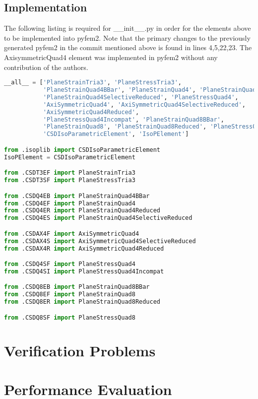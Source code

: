 \documentclass[10pt,letterpaper]{report}
\numberwithin{equation}{chapter}
\begin{document}
\section{Implementation}
The following listing is required for \_\_init\_\_.py in order for the elements above to be implemented into pyfem2. Note that the primary changes to the previously generated pyfem2 in the commit mentioned above is found in lines 4,5,22,23. The AxisymmetricQuad4 element was implemented in pyfem2 without any contribution of the authors.
\begin{lstlisting}[language=Python]
__all__ = ['PlaneStrainTria3', 'PlaneStressTria3',
           'PlaneStrainQuad4BBar', 'PlaneStrainQuad4', 'PlaneStrainQuad4Reduced',
           'PlaneStrainQuad4SelectiveReduced', 'PlaneStressQuad4',
           'AxiSymmetricQuad4', 'AxiSymmetricQuad4SelectiveReduced',
           'AxiSymmetricQuad4Reduced',
           'PlaneStressQuad4Incompat', 'PlaneStrainQuad8BBar',
           'PlaneStrainQuad8', 'PlaneStrainQuad8Reduced', 'PlaneStressQuad8',
           'CSDIsoParametricElement', 'IsoPElement']

from .isoplib import CSDIsoParametricElement
IsoPElement = CSDIsoParametricElement

from .CSDT3EF import PlaneStrainTria3
from .CSDT3SF import PlaneStressTria3

from .CSDQ4EB import PlaneStrainQuad4BBar
from .CSDQ4EF import PlaneStrainQuad4
from .CSDQ4ER import PlaneStrainQuad4Reduced
from .CSDQ4ES import PlaneStrainQuad4SelectiveReduced

from .CSDAX4F import AxiSymmetricQuad4
from .CSDAX4S import AxiSymmetricQuad4SelectiveReduced
from .CSDAX4R import AxiSymmetricQuad4Reduced

from .CSDQ4SF import PlaneStressQuad4
from .CSDQ4SI import PlaneStressQuad4Incompat

from .CSDQ8EB import PlaneStrainQuad8BBar
from .CSDQ8EF import PlaneStrainQuad8
from .CSDQ8ER import PlaneStrainQuad8Reduced

from .CSDQ8SF import PlaneStressQuad8
\end{lstlisting}







\chapter{Verification Problems}

\chapter{Performance Evaluation}
\end{document}
